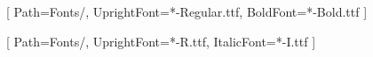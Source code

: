 \usepackage{lmodern}
\usepackage[T1]{fontenc}
\usepackage{calligra}
\usepackage{fontspec}


\setsansfont{Arial}
\setmonofont[]{Courier New}

\newfontfamily{}[
Path=Fonts/,
UprightFont=*-Regular.ttf,
BoldFont=*-Bold.ttf
]

\newfontfamily{}[
Path=Fonts/,
UprightFont=*-R.ttf,
ItalicFont=*-I.ttf
]

\newfontfamily{}
